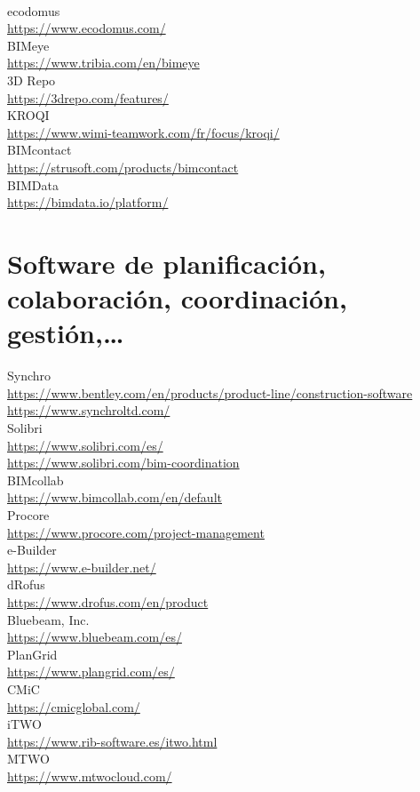 \documentclass[spanish,12pt,a4paper,final,oneside]{book}
\begin{document}
\\ ecodomus \\ \url{https://www.ecodomus.com/}
\\ BIMeye \\ \url{https://www.tribia.com/en/bimeye}
\\ 3D Repo \\ \url{https://3drepo.com/features/}
\\ KROQI \\ \url{https://www.wimi-teamwork.com/fr/focus/kroqi/}
\\ BIMcontact \\ \url{https://strusoft.com/products/bimcontact}
\\ BIMData \\ \url{https://bimdata.io/platform/}

\section{Software de planificación, colaboración, coordinación, gestión,\ldots}
Synchro \\ \url{https://www.bentley.com/en/products/product-line/construction-software} \\ \url{https://www.synchroltd.com/}
\\ Solibri \\ \url{https://www.solibri.com/es/} \\ \url{https://www.solibri.com/bim-coordination}
\\ BIMcollab \\ \url{https://www.bimcollab.com/en/default}
\\ Procore \\ \url{https://www.procore.com/project-management}
\\ e-Builder \\ \url{https://www.e-builder.net/}
\\ dRofus \\ \url{https://www.drofus.com/en/product}
\\ Bluebeam, Inc. \\ \url{https://www.bluebeam.com/es/}
\\ PlanGrid \\ \url{https://www.plangrid.com/es/}
\\ CMiC \\ \url{https://cmicglobal.com/}
\\ iTWO \\ \url{https://www.rib-software.es/itwo.html}
\\ MTWO \\ \url{https://www.mtwocloud.com/}
\end{document}
